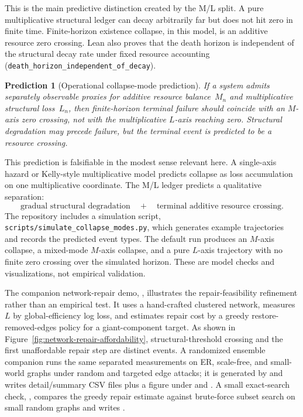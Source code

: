 \documentclass[11pt,a4paper]{article}
\newtheorem{prediction}[theorem]{Prediction}
\begin{document}
This is the main predictive distinction created by the M/L split. A pure multiplicative structural ledger can decay arbitrarily far but does not hit zero in finite time. Finite-horizon existence collapse, in this model, is an additive resource zero crossing. Lean also proves that the death horizon is independent of the structural decay rate under fixed resource accounting (\texttt{death\_horizon\_independent\_of\_decay}).

\begin{prediction}[Operational collapse-mode prediction]
If a system admits separately observable proxies for additive resource balance~$M_n$ and multiplicative structural loss~$L_n$, then finite-horizon terminal failure should coincide with an $M$-axis zero crossing, not with the multiplicative $L$-axis reaching zero. Structural degradation may precede failure, but the terminal event is predicted to be a resource crossing.
\end{prediction}

This prediction is falsifiable in the modest sense relevant here. A single-axis hazard or Kelly-style multiplicative model predicts collapse as loss accumulation on one multiplicative coordinate. The M/L ledger predicts a qualitative separation:
\[
\text{gradual structural degradation} \quad + \quad \text{terminal additive resource crossing}.
\]
The repository includes a simulation script, \texttt{scripts/simulate\_collapse\_modes.py}, which generates example trajectories and records the predicted event types. The default run produces an $M$-axis collapse, a mixed-mode $M$-axis collapse, and a pure $L$-axis trajectory with no finite zero crossing over the simulated horizon. These are model checks and visualizations, not empirical validation.

The companion network-repair demo, , illustrates the repair-feasibility refinement rather than an empirical test. It uses a hand-crafted clustered network, measures $L$ by global-efficiency log loss, and estimates repair cost by a greedy restore-removed-edges policy for a giant-component target. As shown in Figure~\ref{fig:network-repair-affordability}, structural-threshold crossing and the first unaffordable repair step are distinct events. A randomized ensemble companion runs the same separated measurements on ER, scale-free, and small-world graphs under random and targeted edge attacks; it is generated by  and writes detail/summary CSV files plus a figure under  and . A small exact-search check, , compares the greedy repair estimate against brute-force subset search on small random graphs and writes .
\end{document}
